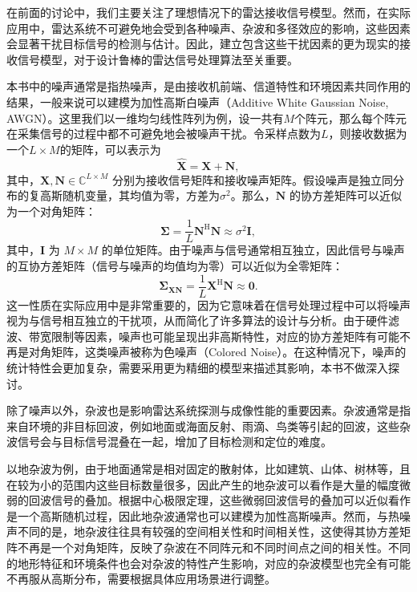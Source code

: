 在前面的讨论中，我们主要关注了理想情况下的雷达接收信号模型。然而，在实际应用中，雷达系统不可避免地会受到各种噪声、杂波和多径效应的影响，这些因素会显著干扰目标信号的检测与估计。因此，建立包含这些干扰因素的更为现实的接收信号模型，对于设计鲁棒的雷达信号处理算法至关重要。

本书中的噪声通常是指热噪声，是由接收机前端、信道特性和环境因素共同作用的结果，一般来说可以建模为加性高斯白噪声（Additive White Gaussian Noise, AWGN）。这里我们以一维均匀线性阵列为例，设一共有\( M \)个阵元，那么每个阵元在采集信号的过程中都不可避免地会被噪声干扰。令采样点数为\( L \)，则接收数据为一个\( L \times M \)的矩阵，可以表示为
\[
    \hat{\mathbf{X}} = \mathbf{X} + \mathbf{N},
\]
其中，\(\mathbf{X}, \mathbf{N} \in \mathbb{C}^{L \times M}\) 分别为接收信号矩阵和接收噪声矩阵。假设噪声是独立同分布的复高斯随机变量，其均值为零，方差为\( \sigma^2 \)。那么，\(\mathbf{N}\) 的协方差矩阵可以近似为一个对角矩阵：
\[
    \mathbf{\Sigma} = \frac{1}{L} \mathbf{N}^{\mathrm{H}} \mathbf{N} \approx \sigma^2 \mathbf{I},
\]
其中，\(\mathbf{I}\) 为 \(M \times M\) 的单位矩阵。由于噪声与信号通常相互独立，因此信号与噪声的互协方差矩阵（信号与噪声的均值均为零）可以近似为全零矩阵：
\[
    \mathbf{\Sigma}_{\mathbf{XN}} = \frac{1}{L} \mathbf{X}^{\mathrm{H}} \mathbf{N} \approx \mathbf{0}.
\]
这一性质在实际应用中是非常重要的，因为它意味着在信号处理过程中可以将噪声视为与信号相互独立的干扰项，从而简化了许多算法的设计与分析。由于硬件滤波、带宽限制等因素，噪声也可能呈现出非高斯特性，对应的协方差矩阵有可能不再是对角矩阵，这类噪声被称为色噪声（Colored Noise）。在这种情况下，噪声的统计特性会更加复杂，需要采用更为精细的模型来描述其影响，本书不做深入探讨。

除了噪声以外，杂波也是影响雷达系统探测与成像性能的重要因素。杂波通常是指来自环境的非目标回波，例如地面或海面反射、雨滴、鸟类等引起的回波，这些杂波信号会与目标信号混叠在一起，增加了目标检测和定位的难度。

以地杂波为例，由于地面通常是相对固定的散射体，比如建筑、山体、树林等，且在较为小的范围内这些目标数量很多，因此产生的地杂波可以看作是大量的幅度微弱的回波信号的叠加。根据中心极限定理，这些微弱回波信号的叠加可以近似看作是一个高斯随机过程，因此地杂波通常也可以建模为加性高斯噪声。然而，与热噪声不同的是，地杂波往往具有较强的空间相关性和时间相关性，这使得其协方差矩阵不再是一个对角矩阵，反映了杂波在不同阵元和不同时间点之间的相关性。不同的地形特征和环境条件也会对杂波的特性产生影响，对应的杂波模型也完全有可能不再服从高斯分布，需要根据具体应用场景进行调整。

